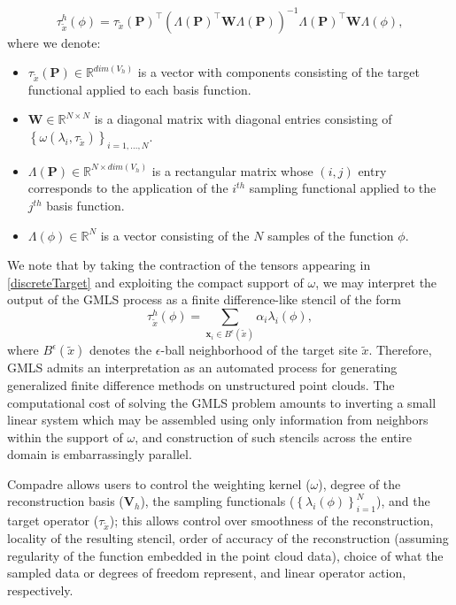 \begin{equation}
\label{discreteTarget}
\tau^h_{\tilde{x}}(\phi) = \tau_{\tilde{x}}(\mathbf{P})^\intercal \left(\Lambda(\mathbf{P})^\intercal \mathbf{W} \Lambda(\mathbf{P})\right)^{-1} \Lambda(\mathbf{P})^\intercal \mathbf{W} \Lambda(\phi),
\end{equation}
where we denote:
\begin{itemize}
  \item $\tau_{\tilde{x}}(\mathbf{P}) \in \mathbb{R}^{dim(V_h)}$ is a vector with components consisting of the target functional applied to each basis function.
  \item $\mathbf{W} \in \mathbb{R}^{N \times N}$ is a diagonal matrix with diagonal entries consisting of $\left\{\omega(\lambda_i,\tau_{\tilde{x}})\right\}_{i=1,...,N}$.
  \item $\Lambda(\mathbf{P}) \in \mathbb{R}^{N \times dim(V_h)}$ is a rectangular matrix whose $(i,j)$ entry corresponds to the application of the $i^{th}$ sampling functional applied to the $j^{th}$ basis function.
  \item $\Lambda(\phi) \in \mathbb{R}^N$ is a vector consisting of the $N$ samples of the function $\phi$.
\end{itemize}
We note that by taking the contraction of the tensors appearing in \eqref{discreteTarget} and exploiting the compact support of $\omega$, we may interpret the output of the GMLS process as a finite difference-like stencil of the form 
\begin{equation}
\tau^h_{\tilde{x}}(\phi) = \sum_{\mathbf{x}_i \in B^\epsilon(\tilde{x})} \alpha_i \lambda_i(\phi),
\end{equation}
where $B^\epsilon(\tilde{x})$ denotes the $\epsilon$-ball neighborhood of the target site $\tilde{x}$. Therefore, GMLS admits an interpretation as an automated process for generating generalized finite difference methods on unstructured point clouds. The computational cost of solving the GMLS problem amounts to inverting a small linear system which may be assembled using only information from neighbors within the support of $\omega$, and construction of such stencils across the entire domain is embarrassingly parallel. 

Compadre allows users to control the weighting kernel ($\omega$), degree of the reconstruction basis ($\mathbf{V}_h$), the sampling functionals ($ \left\{\lambda_i(\phi)\right\}_{i=1}^{N}$), and the target operator ($\tau_{\tilde{x}}$); this allows control over smoothness of the reconstruction, locality of the resulting stencil, order of accuracy of the reconstruction (assuming regularity of the function embedded in the point cloud data), choice of what the sampled data or degrees of freedom represent, and linear operator action, respectively.

